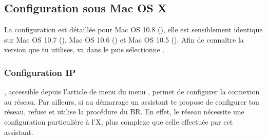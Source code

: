 



\subsection{Configuration sous Mac OS X}

La configuration est d\'etaill\'ee pour Mac OS 10.8 (), elle est sensiblement identique sur Mac OS 10.7 (), Mac OS 10.6 () et Mac OS 10.5 ().
Afin de conna\^itre la version que tu utilises, va dans le  puis s\'electionne .

\subsubsection{Configuration IP}

 , accessible depuis l'article de menu  du menu , permet de configurer la connexion au r\'eseau. Par ailleurs, si au d\'emarrage un assistant te propose de configurer ton r\'eseau, refuse et utilise la proc\'edure du BR. En effet, le r\'eseau n\'ecessite une configuration particuli\`ere \`a l'X, plus complexe que celle effectu\'ee par cet assistant.


